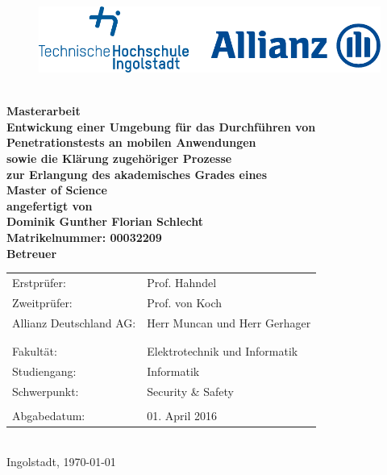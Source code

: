 
\begin{titlepage}

\phantom{tmpText}

\vspace{1cm}

\begin{figure}[h!]
\centering
\includegraphics[width=\textwidth]{bilder/thi_allianz_logo}
\end{figure}

  \begin{center}

    $ $
    \\[3ex]
    \textbf{{\large Masterarbeit} \\[3ex]
    {\large Entwickung einer Umgebung für das Durchführen von}\\[1ex]
    {\LARGE Penetrationstests an mobilen Anwendungen} \\[1ex]
    {\large sowie die Klärung zugehöriger Prozesse}\\[6ex]
    zur Erlangung des akademisches Grades eines \\
    Master of Science\\[2ex]
    \vfill
    angefertigt von \\
    Dominik Gunther Florian Schlecht \\
    {\small \normalfont Matrikelnummer: 00032209}\\[2ex] %
    \vfill
    Betreuer} \\[2ex]
    \begin{tabular}{ll}
      Erstprüfer: & Prof. Hahndel \\
      Zweitprüfer: & Prof. von Koch \\
      Allianz Deutschland AG: & Herr Muncan und Herr Gerhager\\
      \\
      \\
      Fakultät: & Elektrotechnik und Informatik\\
      Studiengang: & Informatik\\
      Schwerpunkt: & Security \& Safety\\
      \\
      Abgabedatum: & 01. April 2016
    \end{tabular} \\[2ex]
    \vfill
    Ingolstadt, \today
  \end{center}
\end{titlepage}
